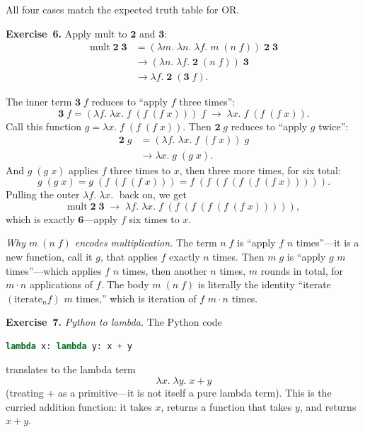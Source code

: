 \documentclass[11pt]{article}
\begin{document}
All four cases match the expected truth table for OR\@.

\medskip
\textbf{Exercise~6.}
Apply $\text{mult}$ to $\mathbf{2}$ and $\mathbf{3}$:
\begin{align*}
  \text{mult}\;\mathbf{2}\;\mathbf{3}
    &= (\lambda m.\;\lambda n.\;\lambda f.\; m\;(n\; f))\;\mathbf{2}\;\mathbf{3} \\
    &\longrightarrow (\lambda n.\;\lambda f.\; \mathbf{2}\;(n\; f))\;\mathbf{3} \\
    &\longrightarrow \lambda f.\; \mathbf{2}\;(\mathbf{3}\; f).
\end{align*}

The inner term $\mathbf{3}\; f$ reduces to ``apply $f$ three times'':
\[
  \mathbf{3}\; f = (\lambda f.\;\lambda x.\; f\;(f\;(f\; x)))\; f
    \;\longrightarrow\; \lambda x.\; f\;(f\;(f\; x)).
\]
Call this function $g = \lambda x.\; f\;(f\;(f\; x))$.  Then
$\mathbf{2}\; g$ reduces to ``apply $g$ twice'':
\begin{align*}
  \mathbf{2}\; g
    &= (\lambda f.\;\lambda x.\; f\;(f\; x))\; g \\
    &\longrightarrow \lambda x.\; g\;(g\; x).
\end{align*}
And $g\;(g\; x)$ applies $f$ three times to $x$, then three more
times, for six total:
\[
  g\;(g\; x) = g\;(f\;(f\;(f\; x))) = f\;(f\;(f\;(f\;(f\;(f\; x))))).
\]
Pulling the outer $\lambda f.\; \lambda x.\;$ back on, we get
\[
  \text{mult}\;\mathbf{2}\;\mathbf{3}
    \;\longrightarrow\; \lambda f.\;\lambda x.\; f\;(f\;(f\;(f\;(f\;(f\; x))))),
\]
which is exactly $\mathbf{6}$---apply $f$ six times to $x$.

\emph{Why $m\;(n\; f)$ encodes multiplication.}  The term $n\; f$ is
``apply $f$ $n$ times''---it is a new function, call it $g$, that
applies $f$ exactly $n$ times.  Then $m\; g$ is ``apply $g$ $m$
times''---which applies $f$ $n$ times, then another $n$ times, $m$
rounds in total, for $m \cdot n$ applications of $f$.  The body
$m\;(n\; f)$ is literally the identity ``iterate $(\text{iterate}_n
f)$ $m$ times,'' which is iteration of $f$ $m \cdot n$ times.

\medskip
\textbf{Exercise~7.}
\emph{Python to lambda.}  The Python code
\begin{lstlisting}[language=Python]
lambda x: lambda y: x + y
\end{lstlisting}
translates to the lambda term
\[
  \lambda x.\; \lambda y.\; x + y
\]
(treating $+$ as a primitive---it is not itself a pure lambda term).
This is the curried addition function: it takes $x$, returns a
function that takes $y$, and returns $x + y$.
\end{document}

